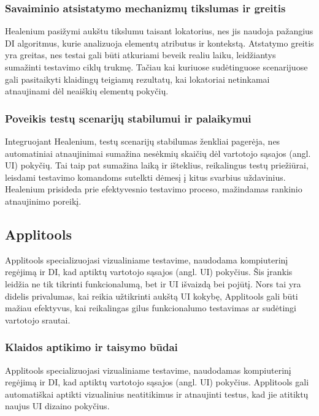 \documentclass[
]{VUMIFPSkursinis}
\begin{document}
\subsubsection{Savaiminio atsistatymo mechanizmų tikslumas ir greitis}

Healenium pasižymi aukštu tikslumu taisant lokatorius, nes jis naudoja pažangius DI algoritmus, kurie analizuoja elementų atributus ir kontekstą. Atstatymo greitis yra greitas, nes testai gali būti atkuriami beveik realiu laiku, leidžiantys sumažinti testavimo ciklų trukmę. Tačiau kai kuriuose sudėtinguose scenarijuose gali pasitaikyti klaidingų teigiamų rezultatų, kai lokatoriai netinkamai atnaujinami dėl neaiškių elementų pokyčių.

\subsubsection{Poveikis testų scenarijų stabilumui ir palaikymui}

Integruojant Healenium, testų scenarijų stabilumas ženkliai pagerėja, nes automatiniai atnaujinimai sumažina nesėkmių skaičių dėl vartotojo sąsajos (angl. UI) pokyčių. Tai taip pat sumažina laiką ir išteklius, reikalingus testų priežiūrai, leisdami testavimo komandoms sutelkti dėmesį į kitus svarbius uždavinius. Healenium prisideda prie efektyvesnio testavimo proceso, mažindamas rankinio atnaujinimo poreikį.

\subsection{Applitools}

Applitools specializuojasi vizualiniame testavime, naudodama kompiuterinį regėjimą ir DI, kad aptiktų vartotojo sąsajos (angl. UI) pokyčius. Šis įrankis leidžia ne tik tikrinti funkcionalumą, bet ir UI išvaizdą bei pojūtį. Nors tai yra didelis privalumas, kai reikia užtikrinti aukštą UI kokybę, Applitools gali būti mažiau efektyvus, kai reikalingas gilus funkcionalumo testavimas ar sudėtingi vartotojo srautai. \cite{Appitools}

\subsubsection{Klaidos aptikimo ir taisymo būdai}

Applitools specializuojasi vizualiniame testavime, naudodamas kompiuterinį regėjimą ir DI, kad aptiktų vartotojo sąsajos (angl. UI) pokyčius. Applitools gali automatiškai aptikti vizualinius neatitikimus ir atnaujinti testus, kad jie atitiktų naujus UI dizaino pokyčius.
\end{document}
